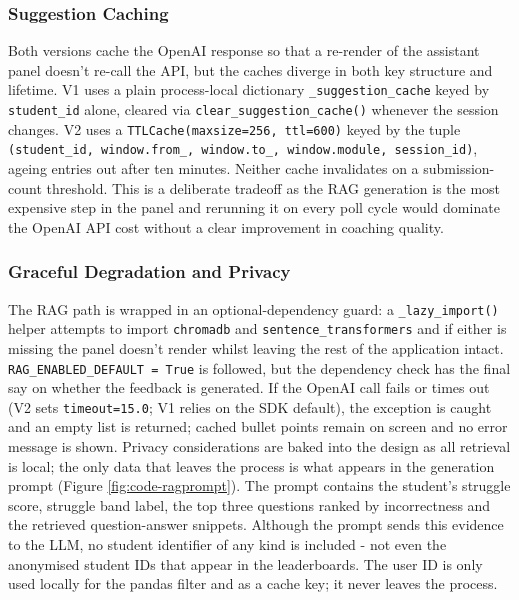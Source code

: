 \subsubsection{Suggestion Caching}

Both versions cache the OpenAI response so that a re-render of the assistant panel doesn't re-call the API, but the caches diverge in both key structure and lifetime.
V1 uses a plain process-local dictionary \texttt{\_suggestion\_cache} keyed by \texttt{student\_id} alone, cleared via \texttt{clear\_suggestion\_cache()} whenever the session changes.
V2 uses a \texttt{TTLCache(maxsize=256, ttl=600)} keyed by the tuple \texttt{(student\_id, window.from\_, window.to\_, window.module, session\_id)}, ageing entries out after ten minutes.
Neither cache invalidates on a submission-count threshold.
This is a deliberate tradeoff as the RAG generation is the most expensive step in the panel and rerunning it on every poll cycle would dominate the OpenAI API cost without a clear improvement in coaching quality.


\subsubsection{Graceful Degradation and Privacy}

The RAG path is wrapped in an optional-dependency guard: a \texttt{\_lazy\_import()} helper attempts to import \texttt{chromadb} and \texttt{sentence\_transformers} and if either is missing the panel doesn't render whilst leaving the rest of the application intact.
\texttt{RAG\_ENABLED\_DEFAULT = True} is followed, but the dependency check has the final say on whether the feedback is generated.
If the OpenAI call fails or times out (V2 sets \texttt{timeout=15.0}; V1 relies on the SDK default), the exception is caught and an empty list is returned; cached bullet points remain on screen and no error message is shown.
Privacy considerations are baked into the design as all retrieval is local; the only data that leaves the process is what appears in the generation prompt (Figure \ref{fig:code-ragprompt}).
The prompt contains the student's struggle score, struggle band label, the top three questions ranked by incorrectness and the retrieved question-answer snippets.
Although the prompt sends this evidence to the LLM, no student identifier of any kind is included - not even the anonymised student IDs that appear in the leaderboards.
The user ID is only used locally for the pandas filter and as a cache key; it never leaves the process.

